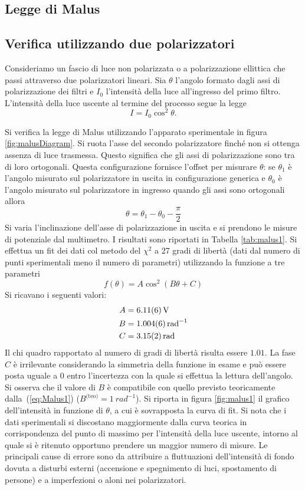 \documentclass[10pt,oneside,a4paper]{article}
\begin{document}
\begin{multicols}{2}
\section{Legge di Malus}
\subsection{Verifica utilizzando due polarizzatori}

Consideriamo un fascio di luce non polarizzata o a polarizzazione ellittica che passi attraverso due polarizzatori lineari. Sia $\theta$ l'angolo formato dagli assi di polarizzazione dei filtri e $I_0$ l'intensità della luce all'ingresso del primo filtro. L'intensità della luce uscente al termine del processo segue la legge
\begin{equation}\label{eq:Malus1}
  I = I_0\cos^2\theta.
\end{equation}

Si verifica la legge di Malus utilizzando l'apparato sperimentale in figura \ref{fig:malusDiagram}. 
Si ruota l'asse del secondo polarizzatore finché non si ottenga assenza di luce trasmessa. Questo significa che gli assi di polarizzazione sono tra di loro ortogonali. Questa configurazione fornisce l'offset per misurare $\theta$: se $\theta_1$ è l'angolo misurato sul polarizzatore in uscita in configurazione generica e $\theta_0$ è l'angolo misurato sul polarizzatore in ingresso quando gli assi sono ortogonali allora
\[
\theta = \theta_1 - \theta_0 - \frac{\pi}{2}
\]
Si varia l'inclinazione dell'asse di polarizzazione in uscita e si prendono le misure di potenziale dal multimetro. I risultati sono riportati in Tabella \ref{tab:malus1}. Si effettua un fit dei dati col metodo del $\chi^2$ a 27 gradi di libertà (dati dal numero di punti sperimentali meno il numero di parametri) utilizzando la funzione a tre parametri
\[
f(\theta) = A\cos^2(B\theta + C)
\]
Si ricavano i seguenti valori:
\[
\begin{aligned}
A &= \SI{6.11 \pm 0.06}{V} \\
B &= \SI{1.004 \pm 0.006}{rad^{-1}} \\
C &= \SI{3.15 \pm 0.02}{rad}
\end{aligned}
\]
Il chi quadro rapportato al numero di gradi di libertà risulta essere $1.01$. La fase $C$ è irrilevante considerando la simmetria della funzione in esame e può essere posta uguale a $0$ entro l'incertezza con la quale si effettua la lettura dell'angolo. Si osserva che il valore di $B$ è compatibile con quello previsto teoricamente dalla~(\ref{eq:Malus1}) ($B^{\text{(teo)}} = \SI{1}{rad^{-1}}$).
Si riporta in figura \ref{fig:malus1} il grafico dell'intensità in funzione di $\theta$, a cui è sovrapposta la curva di fit. Si nota che i dati sperimentali si discostano maggiormente dalla curva teorica in corrispondenza del punto di massimo per l'intensità della luce uscente, intorno al quale si è ritenuto opportuno prendere un maggior numero di misure.
Le principali cause di errore sono da attribuire a fluttuazioni dell'intensità di fondo dovuta a disturbi esterni (accensione e spegnimento di luci, spostamento di persone) e a imperfezioni o aloni nei polarizzatori.



\end{multicols}
\end{document}
